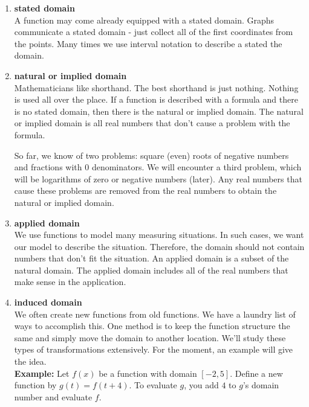 \documentclass{ximera}
\begin{document}
\begin{enumerate}
\item  \textbf{\textcolor{green!50!black}{stated domain}}   \\
A function may come already equipped with a stated domain.  Graphs communicate a stated domain - just collect all of the first coordinates from the points. Many times we use interval notation to describe a stated the domain.


\item  \textbf{\textcolor{green!50!black}{natural or implied domain}}   \\
Mathematicians like shorthand. The best shorthand is just nothing.  Nothing is used all over the place. If a function is described with a formula and there is no stated domain, then there is the natural or implied domain.  The natural or implied domain is all real numbers that don't cause a problem with the formula.

So far, we know of two problems: square (even) roots of negative numbers and fractions with $0$ denominators.  We will encounter a third problem, which will be logarithms of zero or negative numbers (later). Any real numbers that cause these problems are removed from the real numbers to obtain the natural or implied domain.


\item  \textbf{\textcolor{green!50!black}{applied domain}}   \\
We use functions to model many measuring situations. In such cases, we want our model to describe the situation.  Therefore, the domain should not contain numbers that don't fit the situation. An applied domain is a subset of the natural domain.  The applied domain includes all of the real numbers that make sense in the application.


\item \textbf{\textcolor{green!50!black}{induced domain}}  \\
We often create new functions from old functions. We have a laundry list of ways to accomplish this.  One method is to keep the function structure the same and simply move the domain to another location. We'll study these types of transformations extensively. For the moment, an example will give the idea. \\







\textbf{Example:}  Let $f(x)$ be a function with domain $[-2, 5]$.  Define a new function by $g(t) = f(t+4)$.  To evaluate $g$, you add $4$ to $g$'s domain number and evaluate $f$.  


\end{enumerate}
\end{document}
